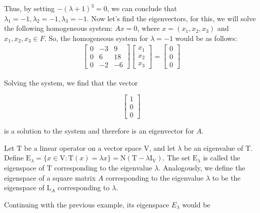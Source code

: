 \documentclass{report}
\begin{document}
\begin{Example}
        Thus, by setting $-(\lambda + 1)^3 = 0$, we can conclude that $\lambda_1 = -1, \lambda_2 = -1, \lambda_3 = -1$. Now let's find the eigenvectors, for this, we will solve the following homogeneous system: $Ax = 0$, where $x = (x_1, x_2, x_3)$ and $x_1, x_2, x_3 \in F$. So, the homogeneous system for $\lambda = -1$ would be as follows:
        \begin{align*}
            \begin{bmatrix}
                0 & -3 & 9\\
                0 & 6 & 18\\
                0 & -2 & -6
            \end{bmatrix}
            \begin{bmatrix}
                x_1\\ x_2\\ x_3
            \end{bmatrix} = \begin{bmatrix}
                0\\0\\0
            \end{bmatrix}
        \end{align*}

        Solving the system, we find that the vector

        $$\begin{bmatrix}
            1\\0\\0
        \end{bmatrix}$$

        is a solution to the system and therefore is an eigenvector for $A$.
    \end{Example}

    \begin{defBox}
        Let $\mathrm{T}$ be a linear operator on a vector space $\mathrm{V}$, and let $\lambda$ be an eigenvalue of $\mathrm{T}$. Define $\mathrm{E}_\lambda=\{x \in \mathrm{V}: \mathrm{T}(x)=\lambda x\}=\mathrm{N}\left(\mathrm{T}-\lambda \mathrm{I}_{\mathrm{V}}\right)$. The set $\mathrm{E}_\lambda$ is called the eigenspace of $\mathrm{T}$ corresponding to the eigenvalue $\lambda$. Analogously, we define the eigenspace of a square matrix $A$ corresponding to the eigenvalue $\lambda$ to be the eigenspace of $\mathrm{L}_A$ corresponding to $\lambda$.
    \end{defBox}

    Continuing with the previous example, its eigenspace $E_\lambda$ would be
\end{document}
